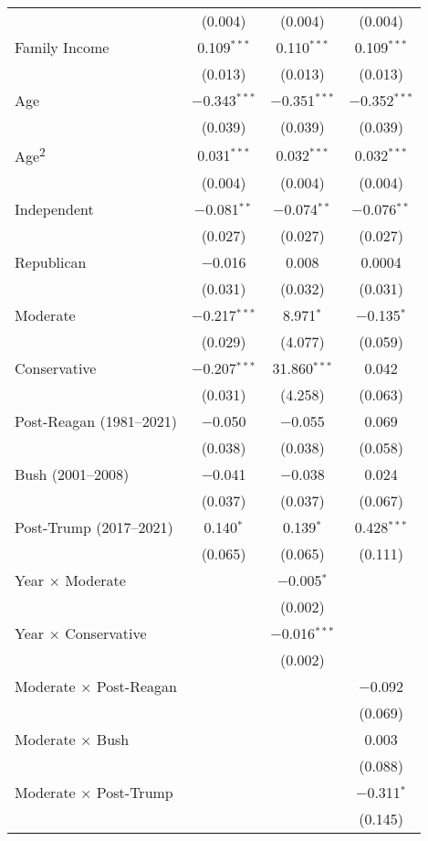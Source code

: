 \begin{ThreePartTable}
\begin{tabularx}{\textwidth}{Xccc}
  & (0.004) & (0.004) & (0.004) \\ 
  Family Income & 0.109$^{***}$ & 0.110$^{***}$ & 0.109$^{***}$ \\ 
  & (0.013) & (0.013) & (0.013) \\ 
  Age & $-$0.343$^{***}$ & $-$0.351$^{***}$ & $-$0.352$^{***}$ \\ 
  & (0.039) & (0.039) & (0.039) \\ 
  Age\textsuperscript{2} & 0.031$^{***}$ & 0.032$^{***}$ & 0.032$^{***}$ \\ 
  & (0.004) & (0.004) & (0.004) \\ 
  Independent & $-$0.081$^{**}$ & $-$0.074$^{**}$ & $-$0.076$^{**}$ \\ 
  & (0.027) & (0.027) & (0.027) \\ 
  Republican & $-$0.016 & 0.008 & 0.0004 \\ 
  & (0.031) & (0.032) & (0.031) \\ 
  Moderate & $-$0.217$^{***}$ & 8.971$^{*}$ & $-$0.135$^{*}$ \\ 
  & (0.029) & (4.077) & (0.059) \\ 
  Conservative & $-$0.207$^{***}$ & 31.860$^{***}$ & 0.042 \\ 
  & (0.031) & (4.258) & (0.063) \\ 
  Post-Reagan (1981--2021) & $-$0.050 & $-$0.055 & 0.069 \\ 
  & (0.038) & (0.038) & (0.058) \\ 
  Bush (2001--2008) & $-$0.041 & $-$0.038 & 0.024 \\ 
  & (0.037) & (0.037) & (0.067) \\ 
  Post-Trump (2017--2021) & 0.140$^{*}$ & 0.139$^{*}$ & 0.428$^{***}$ \\ 
  & (0.065) & (0.065) & (0.111) \\ 
  Year $\times$ Moderate &  & $-$0.005$^{*}$ &  \\ 
  &  & (0.002) &  \\ 
  Year $\times$ Conservative &  & $-$0.016$^{***}$ &  \\ 
  &  & (0.002) &  \\ 
  Moderate $\times$ Post-Reagan &  &  & $-$0.092 \\ 
  &  &  & (0.069) \\ 
  Moderate $\times$ Bush &  &  & 0.003 \\ 
  &  &  & (0.088) \\ 
  Moderate $\times$ Post-Trump &  &  & $-$0.311$^{*}$ \\ 
  &  &  & (0.145) \\ 

\end{tabularx}
\end{ThreePartTable}
